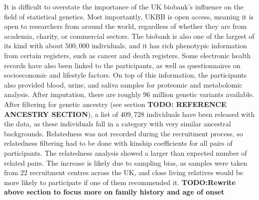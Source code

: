 It is difficult to overstate the importance of the UK biobank's influence on the field of statistical genetics. Most importantly, UKBB is open access, meaning it is open to researchers from around the world, regardless of whether they are from academia, charity, or commercial sectors\cite{bycroft2018uk,biobank2015genotyping}. The biobank is also one of the largest of its kind with about $ 500,000 $ individuals, and it has rich phenotypic information from certain registers, such as cancer and death registers. Some electronic health records have also been linked to the participants, as well as questionnaires on socioeconomic and lifestyle factors. On top of this information, the participants also provided blood, urine, and saliva samples for proteomic and metabolomic analysis.
After imputation\cite{marchini2010genotype}, there are roughly $ 96 $ million genetic variants available. After filtering for genetic ancestry (see section \textbf{TODO: REFERENCE ANCESTRY SECTION}), a list of $ 409,728 $ individuals have been released with the data, as these individuals fall in a category with very similar ancestral backgrounds. Relatedness was not recorded during the recruitment process, so relatedness filtering had to be done with kinship coefficients for all pairs of participants. The relatedness analysis showed a larger than expected number of related pairs. The increase is likely due to sampling bias, as samples were taken from 22 recruitment centres across the UK, and close living relatives would be more likely to participate if one of them recommended it.
\textbf{TODO:Rewrite above section to focus more on family history and age of onset}
